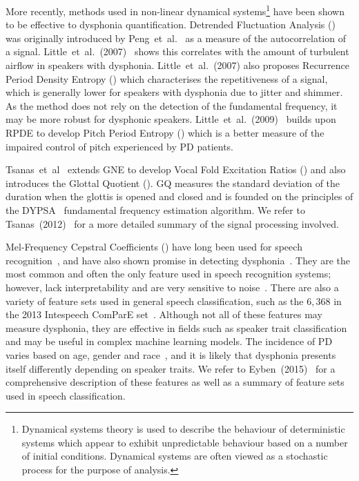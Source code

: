 \documentclass[12pt, twoside]{book}
\renewcommand\emph[1]{\textit{\color{USred}{#1}}}
\begin{document}
\label{dfadescription}
More recently, methods used in non-linear dynamical systems\footnote{Dynamical systems theory is used to describe the behaviour of deterministic systems which appear to exhibit unpredictable behaviour based on a number of initial conditions. Dynamical systems are often viewed as a stochastic process for the purpose of analysis.} have been shown to be effective to dysphonia quantification. Detrended Fluctuation Analysis (\emph{DFA}) was originally introduced by Peng~et~al.~\cite{dfa} as a measure of the autocorrelation of a signal. Little~et~al.~(2007)~\cite{splittlenonlinear2007} shows this correlates with the amount of turbulent airflow in speakers with dysphonia. Little~et~al.~(2007) also proposes Recurrence Period Density Entropy (\emph{RPDE}) which characterises the repetitiveness of a signal, which is generally lower for speakers with dysphonia due to jitter and shimmer. As the method does not rely on the detection of the fundamental frequency, it may be more robust for dysphonic speakers. Little~et~al.~(2009)~\cite{splittledysphonia2009} builds upon RPDE to develop Pitch Period Entropy (\emph{PPE}) which is a better measure of the impaired control of pitch experienced by PD patients.

Tsanas~et~al~\cite{tsanas2012novel} extends GNE to develop Vocal Fold Excitation Ratios (\emph{VFER}) and also introduces the Glottal Quotient (\emph{GQ}). GQ measures the standard deviation of the duration when the glottis is opened and closed and is founded on the principles of the DYPSA~\cite{dypsa} fundamental frequency estimation algorithm. We refer to Tsanas~(2012)~\cite{spoverview} for a more detailed summary of the signal processing involved.

Mel-Frequency Cepstral Coefficients (\emph{MFCC}) have long been used for speech recognition~\cite{mfcc}, and have also shown promise in detecting dysphonia~\cite{mfccml}. They are the most common and often the only feature used in speech recognition systems; however, lack interpretability and are very sensitive to noise~\cite{mfccrobust}. There are also a variety of feature sets used in general speech classification, such as the $6,368$ in the 2013 Intespeech ComParE set~\cite{is2013}. Although not all of these features may measure dysphonia, they are effective in fields such as speaker trait classification and may be useful in complex machine learning models. The incidence of PD varies based on age, gender and race~\cite{ageracial,racial}, and it is likely that dysphonia presents itself differently depending on speaker traits. We refer to Eyben~(2015)~\cite{ostextbook} for a comprehensive description of these features as well as a summary of feature sets used in speech classification.
\end{document}
